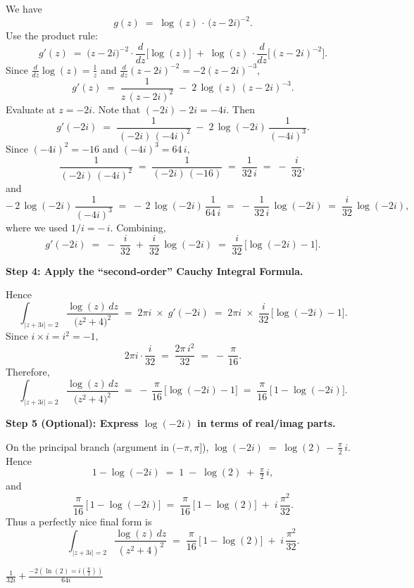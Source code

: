 \documentclass[12pt]{article}
\theoremstyle{definition} %
\theoremstyle{plain} %
\begin{document}
We have
\[
g(z)
\;=\;
\log(z)\,\cdot\,\bigl(z - 2i\bigr)^{-2}.
\]
Use the product rule:
\[
g'(z)
\;=\;
\bigl(z - 2i\bigr)^{-2}\cdot \frac{d}{dz}\bigl[\log(z)\bigr]
\;+\;
\log(z)\,\cdot
\frac{d}{dz}\bigl[(z - 2i)^{-2}\bigr].
\]
Since \(\frac{d}{dz}\log(z)=\frac{1}{z}\) and
\(\frac{d}{dz}(z-2i)^{-2}=-2(z-2i)^{-3}\),
\[
g'(z)
\;=\;
\frac{1}{z\,(z - 2i)^{2}}
\;-\;
2\,\log(z)\,(z - 2i)^{-3}.
\]
Evaluate at \(z=-2i\).  Note that \((-2i)-2i=-4i\).  Then
\[
g'(-2i)
\;=\;
\frac{1}{\,(-2i)\,(-4i)^{2}\!}
\;-\;
2\,\log(-2i)\,\frac{1}{(-4i)^{3}}.
\]
Since \((-4i)^{2}=-16\) and \((-4i)^{3}=64\,i,\)
\[
\frac{1}{(-2i)\,(-4i)^{2}}
\;=\;
\frac{1}{(-2i)\,(-16)}
\;=\;
\frac{1}{32\,i}
\;=\;
-\;\frac{i}{32},
\]
and
\[
-\,2\,\log(-2i)\,\frac{1}{(-4i)^{3}}
\;=\;
-\,2\,\log(-2i)\,\frac{1}{64\,i}
\;=\;
-\,\frac{1}{32\,i}\,\log(-2i)
\;=\;
\frac{i}{32}\,\log(-2i),
\]
where we used \(1/i = -\,i\).  Combining,
\[
g'(-2i)
\;=\;
-\;\frac{i}{32}
\;+\;
\frac{i}{32}\,\log(-2i)
\;=\;
\frac{i}{32}\,\bigl[\log(-2i)-1\bigr].
\]

\textbf{Step 4: Apply the ``second‐order'' Cauchy Integral Formula.}

Hence
\[
\int_{\lvert z+3i\rvert=2}
\frac{\log(z)\,dz}{\bigl(z^{2}+4\bigr)^{2}}
\;=\;
2\pi i \;\times\; g'(-2i)
\;=\;
2\pi i\;\times\;
\frac{i}{32}\,\bigl[\log(-2i)-1\bigr].
\]
Since \(i\times i = i^{2}=-1,\)
\[
2\pi i \cdot \frac{i}{32}
\;=\;
\frac{2\pi\,i^{2}}{32}
\;=\;
-\,\frac{\pi}{16}.
\]
Therefore,
\[
\int_{\lvert z+3i\rvert=2}
\frac{\log(z)\,dz}{\bigl(z^{2}+4\bigr)^{2}}
\;=\;
-\,\frac{\pi}{16}\,\bigl[\log(-2i)-1\bigr]
\;=\;
\frac{\pi}{16}\,\bigl[\,1 - \log(-2i)\bigr].
\]

\textbf{Step 5 (Optional): Express \(\log(-2i)\) in terms of real/imag parts.}

On the principal branch (argument in \((-\pi,\pi]\)), 
\(\log(-2i)\;=\;\log(2)\,-\,\tfrac{\pi}{2}\,i.\)
Hence
\[
1 - \log(-2i) 
\;=\;
1\;-\;\log(2)\;+\;\tfrac{\pi}{2}\,i,
\]
and
\[
\frac{\pi}{16}\,\bigl[\,1 - \log(-2i)\bigr]
\;=\;
\frac{\pi}{16}\,\bigl[\,1 - \log(2)\bigr]
\;+\;
i\,\frac{\pi^{2}}{32}.
\]
Thus a perfectly nice final form is
\[
\boxed{
\int_{\lvert z+3i\rvert=2}
\frac{\log(z)\,dz}{(z^{2}+4)^{2}}
\;=\;
\frac{\pi}{16}\,\bigl[\,1 - \log(2)\bigr]
\;+\;
i\,\frac{\pi^{2}}{32}.
}
\]

$\frac{1}{32i}+\frac{-2(\ln(2)=i(\frac{\pi}{2}))}{64i}$ 
\end{document}
